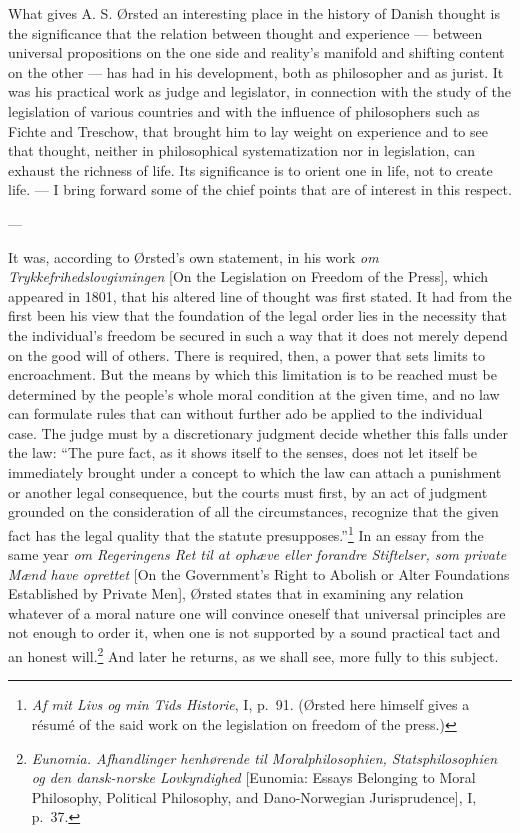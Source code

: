 \documentclass[12pt,a4paper]{book}
\newcommand{\opage}[1]{\marginnote{\footnotesize\textit{[#1]}}}
\begin{document}
What gives A. S. Ørsted an interesting place in the history of Danish thought is the
significance that the relation between thought and experience --- between universal
propositions on the one side and reality's manifold and shifting content on the other
--- has had in his development, both as philosopher and as jurist. It was his practical
work as judge and legislator, in connection with the study of the legislation of various
countries and with the influence of philosophers such as Fichte and Treschow, that
brought him to lay weight on experience and to see that thought, neither in philosophical
systematization nor in legislation, can exhaust the richness of life. Its significance is
to orient one in life, not to create life. --- I bring forward some of the chief points
that are of interest in this respect.

\begin{center}---\end{center}

It was, according to Ørsted's own statement, in his work \emph{om Trykkefrihedslovgivningen}
[On the Legislation on Freedom of the Press], which appeared in 1801, that his altered
line of thought was first stated. It had from the first been his view that the foundation
of the legal order lies in the necessity that the individual's freedom be secured in such
a way that it does not merely depend on the good will of others. There is required, then,
a power that sets limits to encroachment. But the means by which this limitation is to be
reached must be determined by the people's whole moral condition at the given time, and
no law can formulate rules that can without further ado be applied to the individual case.
The judge must by a discretionary judgment decide whether this falls under the law: ``The
pure fact, as it shows itself to the senses, does not let itself be immediately brought
under a concept to which the law can attach a punishment or another legal consequence, but
the courts must first, by \opage{76}an act of judgment grounded on the consideration of all the
circumstances, recognize that the given fact has the legal quality that the statute
presupposes.''\footnote{\emph{Af mit Livs og min Tids Historie}, I, p.~91. (Ørsted here
himself gives a résumé of the said work on the legislation on freedom of the press.)} In
an essay from the same year \emph{om Regeringens Ret til at ophæve eller forandre
Stiftelser, som private Mænd have oprettet} [On the Government's Right to Abolish or Alter
Foundations Established by Private Men], Ørsted states that in examining any relation
whatever of a moral nature one will convince oneself that universal principles are not
enough to order it, when one is not supported by a sound practical tact and an honest
will.\footnote{\emph{Eunomia. Afhandlinger henhørende til Moralphilosophien,
Statsphilosophien og den dansk-norske Lovkyndighed} [Eunomia: Essays Belonging to Moral
Philosophy, Political Philosophy, and Dano-Norwegian Jurisprudence], I, p.~37.} And later
he returns, as we shall see, more fully to this subject.
\end{document}
